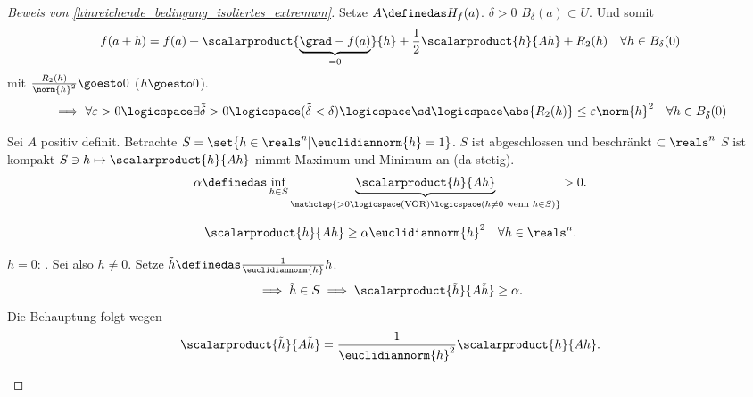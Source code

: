 \begin{proof}[Beweis von \ref{hinreichende_bedingung_isoliertes_extremum}]
  Setze \( A\definedas H_f(a) \). \texists \( \delta>0 \) \sd \( B_\delta(a)\subset U \). Und somit
  \begin{equation*}
    f(a+h)=f(a)+\scalarproduct{\underbrace{\grad-{f}(a)}_{=0}}{h}+\frac{1}{2}\scalarproduct{h}{Ah}+R_2(h)\quad \forall h\in B_\delta(0)
  \end{equation*}
  mit \( \frac{R_2(h)}{\norm{h}^2}\goesto 0 \) (\( h\goesto 0 \)).
  \begin{equation*}
    \implies \forall \varepsilon>0 \logicspace \exists \tilde{\delta}>0\logicspace (\tilde{\delta}<\delta) \logicspace \text{\sd} \logicspace \abs{R_2(h)}\leq \varepsilon \norm{h}^2\quad \forall h\in B_{\tilde{\delta}}(0)
  \end{equation*}
  \begin{proofdescription}
    \item[\ref{hinreichende_bedingung_isoliertes_minimum}] Sei \( A \) positiv definit. Betrachte \( S=\set{h\in \reals^n|\euclidiannorm{h}=1} \). \( S \) ist abgeschlossen und beschränkt \( \subset \reals^n \) \timplies \( S \) ist kompakt \timplies \( S\ni h\mapsto \scalarproduct{h}{Ah} \) nimmt Maximum und Minimum an (da stetig).
    \begin{equation*}
      \alpha\definedas \inf_{h\in S}\underbrace{\scalarproduct{h}{Ah}}_{\mathclap{>0\logicspace  (\text{VOR})\logicspace (h\neq 0 \text{ wenn }h\in S)}}>0.
    \end{equation*}
    \begin{behauptung*}
      \begin{equation*}
        \scalarproduct{h}{Ah}\geq \alpha\euclidiannorm{h}^2 \quad \forall h\in \reals^n.
      \end{equation*}
    \end{behauptung*}
    \begin{subproof}
      \( h=0\): \checkmark. Sei also \( h\neq 0 \). Setze \( \tilde{h}\definedas\frac{1}{\euclidiannorm{h}}h \).  
      \begin{equation*}
        \implies \tilde{h}\in S\implies \scalarproduct{\tilde{h}}{A\tilde{h}}\geq \alpha.
      \end{equation*}
      Die Behauptung folgt wegen
      \begin{equation*}
        \scalarproduct{\tilde{h}}{A\tilde{h}}=\frac{1}{\euclidiannorm{h}^2}\scalarproduct{h}{Ah}.
      \end{equation*}
    \end{subproof}

\end{proofdescription}
\end{proof}
